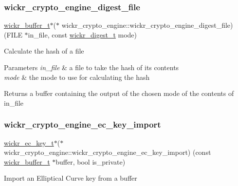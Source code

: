 \subsubsection{\texorpdfstring{wickr\+\_\+crypto\+\_\+engine\+\_\+digest\+\_\+file}{wickr\_crypto\_engine\_digest\_file}}
{\footnotesize\ttfamily \hyperlink{structwickr__buffer}{wickr\+\_\+buffer\+\_\+t}$\ast$($\ast$ wickr\+\_\+crypto\+\_\+engine\+::wickr\+\_\+crypto\+\_\+engine\+\_\+digest\+\_\+file) (F\+I\+LE $\ast$in\+\_\+file, const \hyperlink{structwickr__digest}{wickr\+\_\+digest\+\_\+t} mode)}

Calculate the hash of a file


\begin{DoxyParams}{Parameters}
{\em in\+\_\+file} & a file to take the hash of it\textquotesingle{}s contents \\
\hline
{\em mode} & the mode to use for calculating the hash \\
\hline
\end{DoxyParams}
\begin{DoxyReturn}{Returns}
a buffer containing the output of the chosen mode of the contents of in\+\_\+file 
\end{DoxyReturn}
\mbox{\label{group__wickr__crypto__engine_ga87a069bbd3cdf509946e4ca0ca008f8f}} 
\subsubsection{\texorpdfstring{wickr\+\_\+crypto\+\_\+engine\+\_\+ec\+\_\+key\+\_\+import}{wickr\_crypto\_engine\_ec\_key\_import}}
{\footnotesize\ttfamily \hyperlink{structwickr__ec__key}{wickr\+\_\+ec\+\_\+key\+\_\+t}$\ast$($\ast$ wickr\+\_\+crypto\+\_\+engine\+::wickr\+\_\+crypto\+\_\+engine\+\_\+ec\+\_\+key\+\_\+import) (const \hyperlink{structwickr__buffer}{wickr\+\_\+buffer\+\_\+t} $\ast$buffer, bool is\+\_\+private)}

Import an Elliptical Curve key from a buffer


